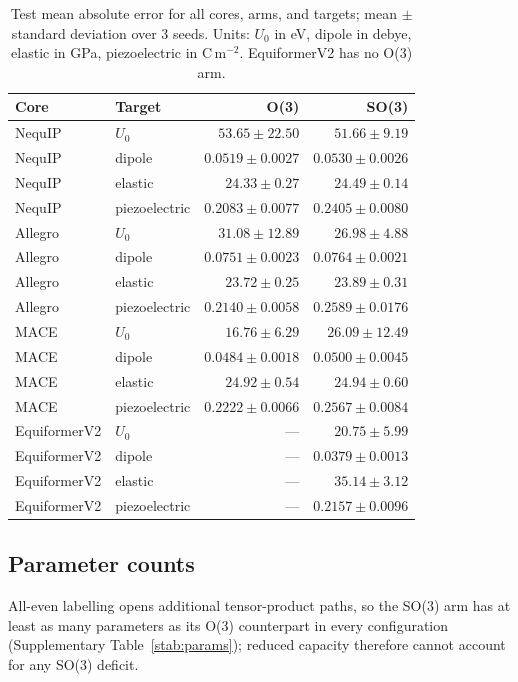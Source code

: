 \begin{table}[htbp]
\centering
\small
\caption{Test mean absolute error for all cores, arms, and targets; mean $\pm$ standard deviation over 3 seeds. Units: $U_0$ in eV, dipole in debye, elastic in GPa, piezoelectric in C\,m$^{-2}$. EquiformerV2 has no O(3) arm.}
\label{stab:accuracy}
\begin{tabular}{llrr}
\toprule
Core & Target & O(3) & SO(3) \\
\midrule
NequIP & $U_0$ & $53.65 \pm 22.50$ & $51.66 \pm 9.19$ \\
NequIP & dipole & $0.0519 \pm 0.0027$ & $0.0530 \pm 0.0026$ \\
NequIP & elastic & $24.33 \pm 0.27$ & $24.49 \pm 0.14$ \\
NequIP & piezoelectric & $0.2083 \pm 0.0077$ & $0.2405 \pm 0.0080$ \\
Allegro & $U_0$ & $31.08 \pm 12.89$ & $26.98 \pm 4.88$ \\
Allegro & dipole & $0.0751 \pm 0.0023$ & $0.0764 \pm 0.0021$ \\
Allegro & elastic & $23.72 \pm 0.25$ & $23.89 \pm 0.31$ \\
Allegro & piezoelectric & $0.2140 \pm 0.0058$ & $0.2589 \pm 0.0176$ \\
MACE & $U_0$ & $16.76 \pm 6.29$ & $26.09 \pm 12.49$ \\
MACE & dipole & $0.0484 \pm 0.0018$ & $0.0500 \pm 0.0045$ \\
MACE & elastic & $24.92 \pm 0.54$ & $24.94 \pm 0.60$ \\
MACE & piezoelectric & $0.2222 \pm 0.0066$ & $0.2567 \pm 0.0084$ \\
EquiformerV2 & $U_0$ & --- & $20.75 \pm 5.99$ \\
EquiformerV2 & dipole & --- & $0.0379 \pm 0.0013$ \\
EquiformerV2 & elastic & --- & $35.14 \pm 3.12$ \\
EquiformerV2 & piezoelectric & --- & $0.2157 \pm 0.0096$ \\
\bottomrule
\end{tabular}
\end{table}

\subsection*{Parameter counts}

All-even labelling opens additional tensor-product paths, so the SO(3) arm has at least as many parameters as its O(3) counterpart in every configuration (Supplementary Table~\ref{stab:params}); reduced capacity therefore cannot account for any SO(3) deficit.

